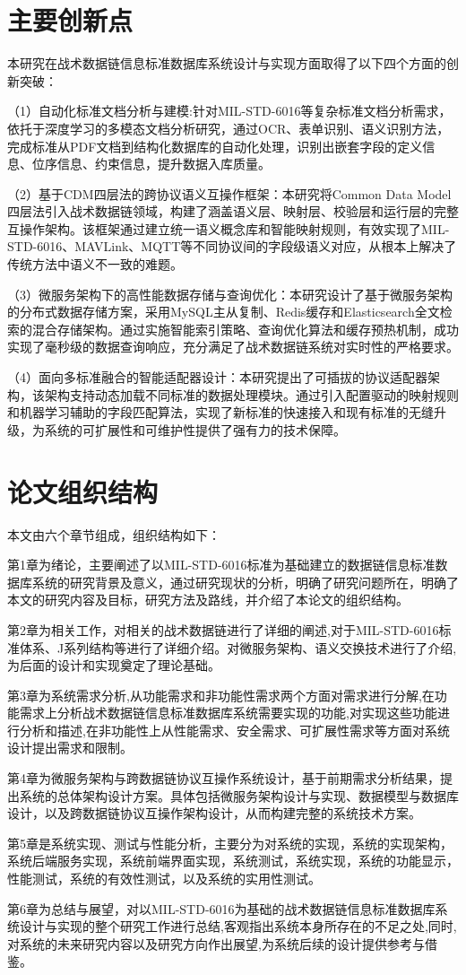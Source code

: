 \section{主要创新点}

本研究在战术数据链信息标准数据库系统设计与实现方面取得了以下四个方面的创新突破：

（1）自动化标准文档分析与建模:针对MIL-STD-6016等复杂标准文档分析需求，依托于深度学习的多模态文档分析研究，通过OCR、表单识别、语义识别方法，完成标准从PDF文档到结构化数据库的自动化处理，识别出嵌套字段的定义信息、位序信息、约束信息，提升数据入库质量。

（2）基于CDM四层法的跨协议语义互操作框架：本研究将Common Data Model四层法引入战术数据链领域，构建了涵盖语义层、映射层、校验层和运行层的完整互操作架构。该框架通过建立统一语义概念库和智能映射规则，有效实现了MIL-STD-6016、MAVLink、MQTT等不同协议间的字段级语义对应，从根本上解决了传统方法中语义不一致的难题。

（3）微服务架构下的高性能数据存储与查询优化：本研究设计了基于微服务架构的分布式数据存储方案，采用MySQL主从复制、Redis缓存和Elasticsearch全文检索的混合存储架构。通过实施智能索引策略、查询优化算法和缓存预热机制，成功实现了毫秒级的数据查询响应，充分满足了战术数据链系统对实时性的严格要求。

（4）面向多标准融合的智能适配器设计：本研究提出了可插拔的协议适配器架构，该架构支持动态加载不同标准的数据处理模块。通过引入配置驱动的映射规则和机器学习辅助的字段匹配算法，实现了新标准的快速接入和现有标准的无缝升级，为系统的可扩展性和可维护性提供了强有力的技术保障。

\section{论文组织结构}

本文由六个章节组成，组织结构如下：

第1章为绪论，主要阐述了以MIL-STD-6016标准为基础建立的数据链信息标准数据库系统的研究背景及意义，通过研究现状的分析，明确了研究问题所在，明确了本文的研究内容及目标，研究方法及路线，并介绍了本论文的组织结构。

第2章为相关工作，对相关的战术数据链进行了详细的阐述,对于MIL-STD-6016标准体系、J系列结构等进行了详细介绍。对微服务架构、语义交换技术进行了介绍,为后面的设计和实现奠定了理论基础。

第3章为系统需求分析,从功能需求和非功能性需求两个方面对需求进行分解,在功能需求上分析战术数据链信息标准数据库系统需要实现的功能,对实现这些功能进行分析和描述,在非功能性上从性能需求、安全需求、可扩展性需求等方面对系统设计提出需求和限制。

第4章为微服务架构与跨数据链协议互操作系统设计，基于前期需求分析结果，提出系统的总体架构设计方案。具体包括微服务架构设计与实现、数据模型与数据库设计，以及跨数据链协议互操作架构设计，从而构建完整的系统技术方案。

第5章是系统实现、测试与性能分析，主要分为对系统的实现，系统的实现架构，系统后端服务实现，系统前端界面实现，系统测试，系统实现，系统的功能显示，性能测试，系统的有效性测试，以及系统的实用性测试。

第6章为总结与展望，对以MIL-STD-6016为基础的战术数据链信息标准数据库系统设计与实现的整个研究工作进行总结,客观指出系统本身所存在的不足之处,同时,对系统的未来研究内容以及研究方向作出展望,为系统后续的设计提供参考与借鉴。
